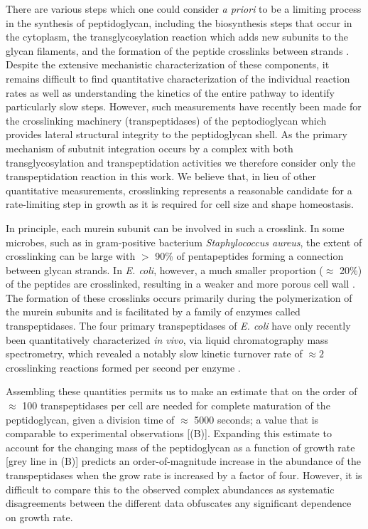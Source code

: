 There are various steps which one could consider \textit{a priori} to be a
limiting process in the synthesis of peptidoglycan, including the
biosynthesis steps that occur in the cytoplasm, the transglycosylation
reaction which adds new subunits to the glycan filaments, and the formation
of the peptide crosslinks between strands
\cite{shi2018,morgenstein2015,lovering2012,barreteau2008}. Despite the
extensive mechanistic characterization of these components, it remains
difficult to find quantitative characterization of the individual reaction
rates as well as understanding the kinetics of the entire pathway to identify
particularly slow steps. However, such measurements have recently been made
for the crosslinking machinery (transpeptidases) of the peptodioglycan which
provides lateral structural integrity to the peptidoglycan shell. As the
primary mechanism of subutnit integration occurs by a complex with both
transglycosylation and transpeptidation activities \cite{shi2018} we
therefore consider only the transpeptidation reaction in this work. We
believe that, in lieu of other quantitative measurements, crosslinking
represents a reasonable candidate for a rate-limiting step in growth as it is
required for cell size and shape homeostasis.

In principle, each murein subunit can be involved in such a crosslink. In some
microbes, such as in gram-positive bacterium \textit{Staphylococcus aureus}, the
extent of crosslinking can be large with $>$ 90\% of pentapeptides forming a
connection between glycan strands. In \textit{E. coli}, however, a much smaller
proportion ($\approx$ 20\%) of the peptides are crosslinked, resulting in a
weaker and more porous cell wall \citep{vollmer2008a, rogers1980}. The formation
of these crosslinks occurs primarily during the polymerization of the murein
subunits and is facilitated by a family of enzymes called transpeptidases. The
four primary transpeptidases of \textit{E. coli} have only recently been
quantitatively characterized \textit{in vivo}, via liquid chromatography mass
spectrometry, which revealed a notably slow kinetic turnover rate of $\approx 2$
crosslinking reactions formed per second per enzyme \citep{catherwood2020}.

Assembling these quantities permits us to make an estimate that on the order of
$\approx$ 100 transpeptidases per cell are needed for complete maturation of the
peptidoglycan, given a division time of $\approx$ 5000 seconds; a value that is
comparable to experimental observations [(B)]. Expanding this
estimate to account for the changing mass of the peptidoglycan as a function
of growth rate [grey line in (B)] predicts an order-of-magnitude increase in
the abundance of the transpeptidases when the grow rate is increased by a factor of four. However,
it is difficult to compare this to the observed complex abundances as systematic disagreements between the
different data obfuscates any significant dependence on growth rate.

